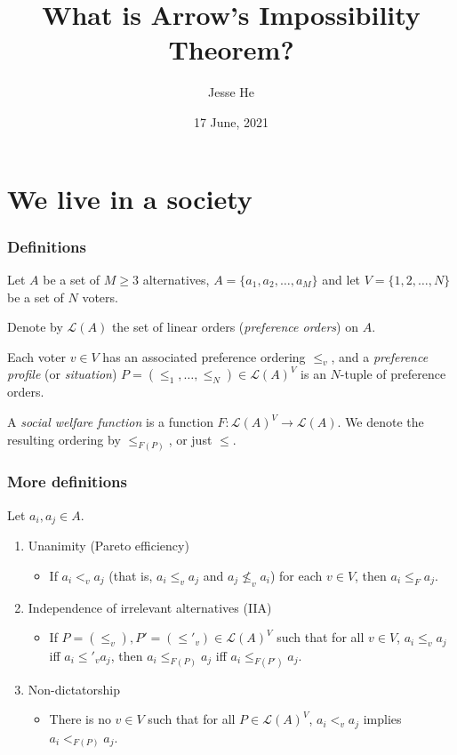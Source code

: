 \documentclass{beamer}
\title{What is Arrow's Impossibility Theorem?}
\author{Jesse He}
\institute{OSU What Is?}
\date{17 June, 2021}
\theoremstyle{definition}
\begin{document}
    
\frame{\titlepage}

\section{We live in a society}

\begin{frame}
    \frametitle{Definitions}
    
    Let $A$ be a set of $M \geq 3$ alternatives, $A = \{a_1, a_2, \dots, a_M\}$ and let $V = \{1, 2, \dots, N\}$ be a set of $N$ voters.

    \pause
    Denote by $\mathcal{L}(A)$ the set of linear orders (\emph{preference orders}) on $A$.

    \pause
    Each voter $v \in V$ has an associated preference ordering $\leq_v$, and a \emph{preference profile} (or \emph{situation})
    $P = (\leq_1, \dots, \leq_N) \in \mathcal{L}(A)^V$ is an $N$-tuple of preference orders.

    \pause
    A \emph{social welfare function} is a function $F : \mathcal{L}(A)^V \to \mathcal{L}(A)$. We denote the resulting ordering by $\leq_{F(P)}$,
    or just $\leq$.
\end{frame}

\begin{frame}
    \frametitle{More definitions}

    Let $a_i, a_j \in A$.

    \begin{enumerate}
        \item Unanimity (Pareto efficiency)
        \begin{itemize}
            \item<2-> If $a_i <_v a_j$ (that is, $a_i \leq_v a_j$ and $a_j \not\leq_v a_i$) for each $v \in V$, then $a_i \leq_F a_j$. 
        \end{itemize}

        \item Independence of irrelevant alternatives (IIA)
        \begin{itemize}
            \item<3-> If $P = (\leq_v), P' = (\leq'_v) \in \mathcal{L}(A)^V$ such that for all $v \in V$, $a_i \leq_v a_j$
            iff $a_i \leq'_v a_j$, then $a_i \leq_{F(P)} a_j$ iff $a_i \leq_{F(P')} a_j$.
        \end{itemize}
        

        \item Non-dictatorship
        \begin{itemize}
            \item<4-> There is no $v \in V$ such that for all $P \in \mathcal{L}(A)^V$, $a_i <_v a_j$ implies $a_i <_{F(P)} a_j$.
        \end{itemize}
        
    \end{enumerate}

\end{frame}
\end{document}

